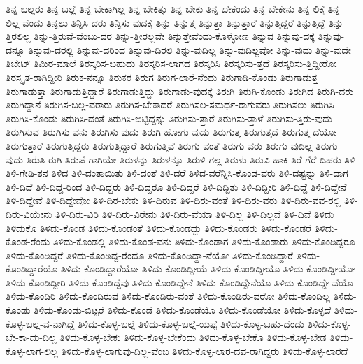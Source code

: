 {ತಿನ್ನ-ಬಲ್ಲರು
ತಿನ್ನ-ಬಲ್ಲೆ
ತಿನ್ನ-ಬೇಕಾಗಿಲ್ಲ
ತಿನ್ನ-ಬೇಕಿತ್ತು
ತಿನ್ನ-ಬೇಕು
ತಿನ್ನ-ಬೇಕೆಂದು
ತಿನ್ನ-ಬೇಕೇನು
ತಿನ್ನ-ಲಿಕ್ಕೆ
ತಿನ್ನ-ಲಿಲ್ಲ-ವೆಂದು
ತಿನ್ನಲು
ತಿನ್ನಿಸಿ-ದರು
ತಿನ್ನಿಸು-ವುದಕ್ಕೆ
ತಿನ್ನು
ತಿನ್ನುತ್ತ
ತಿನ್ನುತ್ತಾ
ತಿನ್ನುತ್ತಾರೆ
ತಿನ್ನುತ್ತಿದ್ದರೆ
ತಿನ್ನುತ್ತಿದ್ದೆ
ತಿನ್ನು-ತ್ತಿರಲಿಲ್ಲ
ತಿನ್ನು-ತ್ತಿರುವೆ-ವೆಂಬು-ದರ
ತಿನ್ನು-ತ್ತೀರಲ್ಲವೇ
ತಿನ್ನುತ್ತೇವೆಂದು-ಕೊಳ್ಳೋಣ
ತಿನ್ನುವ
ತಿನ್ನುವು-ದಕ್ಕೆ
ತಿನ್ನುವು-ದನ್ನೂ
ತಿನ್ನುವು-ದರಲ್ಲಿ
ತಿನ್ನುವು-ದರಿಂದ
ತಿನ್ನುವು-ದಿರಲಿ
ತಿನ್ನು-ವುದಿಲ್ಲ
ತಿನ್ನು-ವುದಿಲ್ಲವೋ
ತಿನ್ನು-ವುದು
ತಿನ್ನು-ವುದೇ
ತಿಬೇಟ್
ತಿಮಿರ-ಮಾಲೆ
ತಿರಸ್ಕರಿಸ-ಬಹುದು
ತಿರಸ್ಕರಿಸ-ಲಾಗದ
ತಿರಸ್ಕರಿಸಿ
ತಿರಸ್ಕರಿಸು-ತ್ತದೆ
ತಿರಸ್ಕರಿಸು-ತ್ತಿದ್ದೀರೋ
ತಿರಸ್ಕೃತ-ರಾಗಿದ್ದೀರಿ
ತಿರುಕ-ನನ್ನೂ
ತಿರುಕರ
ತಿರುಗ
ತಿರುಗ-ಲಾರೆ-ನೆಂದು
ತಿರುಗಾಡಿ-ಕೊಂಡು
ತಿರುಗಾಡುತ್ತ
ತಿರುಗಾಡುತ್ತಾ
ತಿರುಗಾಡುತ್ತಿದ್ದಾರೆ
ತಿರುಗಾಡುತ್ತಿದ್ದು
ತಿರುಗಾಡು-ವುದಕ್ಕೆ
ತಿರುಗಿ
ತಿರುಗಿ-ಕೊಂಡು
ತಿರುಗಿದ
ತಿರುಗಿ-ದರು
ತಿರುಗಿದ್ದಾನೆ
ತಿರುಗಿಸ-ಬಲ್ಲ-ವರಾರು
ತಿರುಗಿಸ-ಬೇಕಾದರೆ
ತಿರುಗಿಸಲ-ಸಮರ್ಥ-ರಾಗುವರು
ತಿರುಗಿಸಲು
ತಿರುಗಿಸಿ
ತಿರುಗಿಸಿ-ಕೊಂಡು
ತಿರುಗಿಸಿ-ದಂತೆ
ತಿರುಗಿಸಿ-ಬಿಟ್ಟಿದ್ದನ್ನು
ತಿರುಗಿಸು-ತ್ತಾರೆ
ತಿರುಗಿಸು-ತ್ತಾಳೆ
ತಿರುಗಿಸು-ತ್ತಿರು-ವುದು
ತಿರುಗಿಸುವ
ತಿರುಗಿಸು-ವನು
ತಿರುಗಿಸು-ವುದು
ತಿರುಗಿ-ಹೋಗು-ವುದು
ತಿರುಗುತ್ತ
ತಿರುಗುತ್ತದೆ
ತಿರುಗುತ್ತ-ದೆಯೋ
ತಿರುಗುತ್ತಾರೆ
ತಿರುಗುತ್ತಿದ್ದರು
ತಿರುಗುತ್ತಿದ್ದಾರೆ
ತಿರುಗುತ್ತಿವೆ
ತಿರುಗು-ವಂತೆ
ತಿರುಗು-ವರು
ತಿರುಗು-ವುದಿಲ್ಲ
ತಿರುಗು-ವುದು
ತಿರುತಿ-ರುಗಿ
ತಿರುಪೆ-ಗಾಗಿಯೇ
ತಿರುಳನ್ನು
ತಿರುಳನ್ನೂ
ತಿರುಳಿ-ಗಲ್ಲ
ತಿರುಳು
ತಿರುವಿ-ಹಾಕಿ
ತಿರೆ-ಗೆರೆ-ದಿಹರು
ತಿಳಿ
ತಿಳಿ-ಗೇಡಿ-ತನ
ತಿಳಿದ
ತಿಳಿ-ದಂತಾಯಿತು
ತಿಳಿ-ದಂತೆ
ತಿಳಿ-ದರೆ
ತಿಳಿದ-ವರೆನ್ನಿಸಿ-ಕೊಂಡ-ವರು
ತಿಳಿ-ದಷ್ಟನ್ನು
ತಿಳಿ-ದಾಗ
ತಿಳಿ-ದಿದೆ
ತಿಳಿ-ದಿದ್ದ-ರಿಂದ
ತಿಳಿ-ದಿದ್ದರು
ತಿಳಿ-ದಿದ್ದರೂ
ತಿಳಿ-ದಿದ್ದರೆ
ತಿಳಿ-ದಿದ್ದಿತು
ತಿಳಿ-ದಿದ್ದೀರಿ
ತಿಳಿ-ದಿದ್ದೆ
ತಿಳಿ-ದಿದ್ದೇನೆ
ತಿಳಿ-ದಿದ್ದೇವೆ
ತಿಳಿ-ದಿದ್ದೇವೋ
ತಿಳಿ-ದಿರ-ಬೇಕು
ತಿಳಿ-ದಿರುವ
ತಿಳಿ-ದಿರು-ವಂತೆ
ತಿಳಿ-ದಿರು-ವರು
ತಿಳಿ-ದಿರು-ವವ-ರಲ್ಲಿ
ತಿಳಿ-ದಿರು-ವಿಯೇನು
ತಿಳಿ-ದಿರು-ವಿರಿ
ತಿಳಿ-ದಿರು-ವಿರೇನು
ತಿಳಿ-ದಿರು-ವೆಯಾ
ತಿಳಿ-ದಿಲ್ಲ
ತಿಳಿ-ದಿಲ್ಲವೆ
ತಿಳಿ-ದಿವೆ
ತಿಳಿದು
ತಿಳಿದುಕೊ
ತಿಳಿದು-ಕೊಂಡ
ತಿಳಿದು-ಕೊಂಡಂತೆ
ತಿಳಿದು-ಕೊಂಡದ್ದು
ತಿಳಿದು-ಕೊಂಡರು
ತಿಳಿದು-ಕೊಂಡರೆ
ತಿಳಿದು-ಕೊಂಡ-ರೆಂದು
ತಿಳಿದು-ಕೊಂಡಲ್ಲಿ
ತಿಳಿದು-ಕೊಂಡ-ವನು
ತಿಳಿದು-ಕೊಂಡಾಗ
ತಿಳಿದು-ಕೊಂಡಾರು
ತಿಳಿದು-ಕೊಂಡಿದ್ದರೂ
ತಿಳಿದು-ಕೊಂಡಿದ್ದರೆ
ತಿಳಿದು-ಕೊಂಡಿದ್ದ-ರೆಂದೂ
ತಿಳಿದು-ಕೊಂಡಿದ್ದಾ-ನೆಯೋ
ತಿಳಿದು-ಕೊಂಡಿದ್ದಾರೆ
ತಿಳಿದು-ಕೊಂಡಿದ್ದಾರೆಯೊ
ತಿಳಿದು-ಕೊಂಡಿದ್ದಾರೆಯೋ
ತಿಳಿದು-ಕೊಂಡಿದ್ದೀಯೆ
ತಿಳಿದು-ಕೊಂಡಿದ್ದೀಯೊ
ತಿಳಿದು-ಕೊಂಡಿದ್ದೀಯೋ
ತಿಳಿದು-ಕೊಂಡಿದ್ದೀರಿ
ತಿಳಿದು-ಕೊಂಡಿದ್ದೆವು
ತಿಳಿದು-ಕೊಂಡಿದ್ದೇನೆ
ತಿಳಿದು-ಕೊಂಡಿದ್ದೇನೆಯೊ
ತಿಳಿದು-ಕೊಂಡಿದ್ದೇ-ವೆಯೊ
ತಿಳಿದು-ಕೊಂಡಿರಿ
ತಿಳಿದು-ಕೊಂಡಿರುವ
ತಿಳಿದು-ಕೊಂಡಿರು-ವಂತೆ
ತಿಳಿದು-ಕೊಂಡಿರು-ವರೋ
ತಿಳಿದು-ಕೊಂಡಿಲ್ಲ
ತಿಳಿದು-ಕೊಂಡು
ತಿಳಿದು-ಕೊಂಡು-ಬಿಟ್ಟರೆ
ತಿಳಿದು-ಕೊಂಡೆ
ತಿಳಿದು-ಕೊಂಡೆಯೊ
ತಿಳಿದು-ಕೊಂಡೆಯೋ
ತಿಳಿದು-ಕೊಳ್ಳದೆ
ತಿಳಿದು-ಕೊಳ್ಳ-ಬಲ್ಲ-ವ-ನಾಗಿದ್ದೆ
ತಿಳಿದು-ಕೊಳ್ಳ-ಬಲ್ಲೆ
ತಿಳಿದು-ಕೊಳ್ಳ-ಬಲ್ಲೆ-ಯಷ್ಟೆ
ತಿಳಿದು-ಕೊಳ್ಳ-ಬಹು-ದೆಂದು
ತಿಳಿದು-ಕೊಳ್ಳ-ಬೇ-ಕಾ-ದು-ದಿಲ್ಲ
ತಿಳಿದು-ಕೊಳ್ಳ-ಬೇಕು
ತಿಳಿದು-ಕೊಳ್ಳ-ಬೇಕೆಂದು
ತಿಳಿದು-ಕೊಳ್ಳ-ಬೇಕೊ
ತಿಳಿದು-ಕೊಳ್ಳ-ಬೇಡ
ತಿಳಿದು-ಕೊಳ್ಳ-ಲಾಗ-ಲಿಲ್ಲ
ತಿಳಿದು-ಕೊಳ್ಳ-ಲಾಗುವು-ದಿಲ್ಲ-ವೆಂಬ
ತಿಳಿದು-ಕೊಳ್ಳ-ಲಾರ-ದವ-ರಾಗಿದ್ದರು
ತಿಳಿದು-ಕೊಳ್ಳ-ಲಾರದೆ
}
